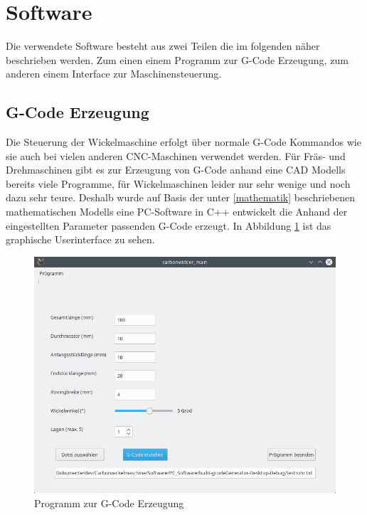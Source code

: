 \documentclass[paper=A4,pagesize,DIV=18, 12pt,listof=totoc,bibliography=totoc,headings=optiontohead,open=any]{article}
\begin{document}
\section{Software}
Die verwendete Software besteht aus zwei Teilen die im folgenden näher beschrieben werden. Zum einen einem Programm zur G-Code Erzeugung, zum anderen einem Interface zur Maschinensteuerung.
\subsection{G-Code Erzeugung}
\label{software}
Die Steuerung der Wickelmaschine erfolgt über normale G-Code Kommandos wie sie auch bei vielen anderen CNC-Maschinen verwendet werden. Für Fräs- und Drehmaschinen gibt es zur Erzeugung von G-Code anhand eine CAD Modells bereits viele Programme, für Wickelmaschinen leider nur sehr wenige und noch dazu sehr teure. Deshalb wurde auf Basis der unter \ref{mathematik} beschriebenen mathematischen Modells eine PC-Software in C++ entwickelt die  Anhand der eingestellten Parameter passenden G-Code erzeugt. In Abbildung \ref{fig:g-code} ist das graphische Userinterface zu sehen. 
\begin{figure}[H]
	\centering
	\includegraphics[width=1\textwidth]{bilder/carbowickler_software.png}
	\caption{Programm zur G-Code Erzeugung} 
	\label{fig:g-code}
\end{figure}
\end{document}
